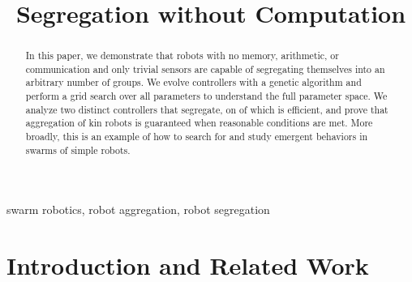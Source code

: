 \documentclass[conference]{IEEEtran}
\begin{document}
\title{Segregation without Computation}

\author{
}


\maketitle

\begin{abstract}
  In this paper, we demonstrate that robots with no memory, arithmetic, or communication and only trivial sensors are capable of segregating themselves into an arbitrary number of groups. We evolve controllers with a genetic algorithm and perform a grid search over all parameters to understand the full parameter space. We analyze two distinct controllers that segregate, on of which is efficient, and prove that aggregation of kin robots is guaranteed when reasonable conditions are met. More broadly, this is an example of how to search for and study emergent behaviors in swarms of simple robots.
\end{abstract}

\begin{IEEEkeywords}
  swarm robotics, robot aggregation, robot segregation
\end{IEEEkeywords}

\section{Introduction and Related Work}
\end{document}
